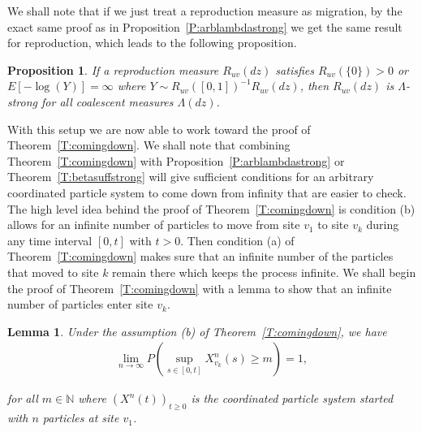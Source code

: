 \documentclass[11pt]{article}
\newtheorem{proposition}{Proposition}
\newtheorem{lemma}{Lemma}
\theoremstyle{definition}
\newcommand{\N}{\mathbb{N}}
\newcommand{\thmref}[1]{Theorem~\ref{T:#1}}
\newcommand{\propref}[1]{Proposition~\ref{P:#1}}
\begin{document}
\noindent We shall note that if we just treat a reproduction measure as migration, by the exact same proof as in \propref{arblambdastrong} we get the same result for reproduction, which leads to the following proposition.

\begin{proposition}
    If a reproduction measure $R_{uv}(dz)$ satisfies $R_{uv}(\{0\}) > 0$ or $E[-\log(Y)] = \infty$ where $Y \sim R_{uv}([0,1])^{-1}R_{uv}(dz)$, then $R_{uv}(dz)$ is $\Lambda$-strong for all coalescent measures $\Lambda(dz)$.
\end{proposition}

\noindent With this setup we are now able to work toward the proof of \thmref{comingdown}. We shall note that combining \thmref{comingdown} with \propref{arblambdastrong} or \thmref{betasuffstrong} will give sufficient conditions for an arbitrary coordinated particle system to come down from infinity that are easier to check. The high level idea behind the proof of \thmref{comingdown} is condition (b) allows for an infinite number of particles to move from site $v_1$ to site $v_k$ during any time interval $[0,t]$ with $t > 0$. Then condition (a) of \thmref{comingdown} makes sure that an infinite number of the particles that moved to site $k$ remain there which keeps the process infinite. We shall begin the proof of \thmref{comingdown} with a lemma to show that an infinite number of particles enter site $v_k$. 

\begin{lemma}\label{L:inftymovements}
    Under the assumption (b) of \thmref{comingdown}, we have
    \begin{align*}
        \lim_{n \to \infty}P\left(\sup_{s \in [0,t]} X_{v_k}^n(s) \geq m\right) = 1,
    \end{align*}
    
    \noindent for all $m \in \N$ where $(X^n(t))_{t\geq 0}$ is the coordinated particle system started with $n$ particles at site $v_1$.
\end{lemma}
\end{document}
